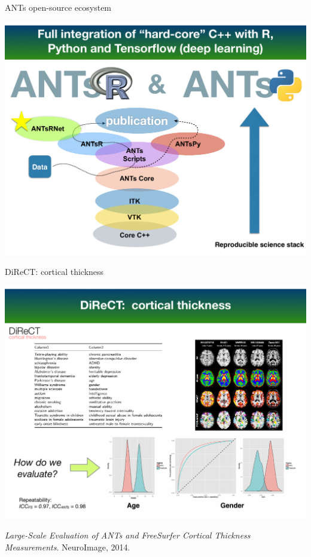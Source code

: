 \documentclass[ignorenonframetext,]{beamer}
\begin{document}
\begin{frame}{ANTs open-source ecosystem}

\usebackgroundtemplate{\texttt{[image: ]}}

\vspace*{-.225cm} \hspace*{-.5cm}
\includegraphics[width=1.07\textwidth,height=0.92\textheight]{../../Figures/antsEcosystem.pdf}

\end{frame}

\begin{frame}{DiReCT: cortical thickness}

\usebackgroundtemplate{\texttt{[image: ]}}

\vspace*{-.225cm} \hspace*{-.5cm}
\includegraphics[width=1.085\textwidth,height=0.825\textheight]{../../Figures/direct.pdf}

\tiny

\begin{flushright}
{\em Large-Scale Evaluation of ANTs and FreeSurfer Cortical Thickness Measurements}. NeuroImage, 2014.
\end{flushright}

\end{frame}
\end{document}
